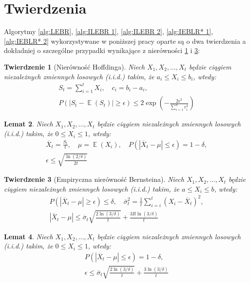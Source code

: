 \documentclass[inzynierska]{pwr_wmat_praca_dyplomowa}
\theoremstyle{plain}
\newtheorem{theorem}{Twierdzenie}
\numberwithin{theorem}{chapter}
\newtheorem{lemma}[theorem]{Lemat}
\theoremstyle{definition}
\numberwithin{theorem}{chapter}
\DeclareMathOperator{\EX}{\mathbb{E}}%
\begin{document}
	\section{Twierdzenia}
	Algorytmy \ref{alg:LEBR}, \ref{alg:ILEBR 1}, \ref{alg:ILEBR 2}, \ref{alg:IEBLR* 1}, \ref{alg:IEBLR* 2} wykorzystywane w poniższej pracy oparte są o dwa twierdzenia a dokładniej o szczególne przypadki wynikające z nierówności \ref{Hoffding ineq} i \ref{Bernsteina emp ineq}:
	\begin{theorem}[Nierówność Hoffdinga]
		\label{Hoffding ineq}
		Niech $X_1,X_2,\dots,X_t$ będzie ciągiem niezależnych zmiennych losowych (i.i.d.) takim, że $a_i \le X_i \le b_i$, wtedy:
		\begin{gather*}
			S_t = \sum_{i=1}^{t} X_i,\quad c_i = b_i - a_i, \\
			P(|S_t - \EX(S_t)| \ge \epsilon ) \le 2\exp\left( -\frac{2\epsilon^2}{\sum_{i=1}^{n} c_i^2} \right)
		\end{gather*}
	\end{theorem}
	\begin{lemma}
		\label{Hoffding ineq lemma}
		Niech $X_1,X_2,\dots,X_t$ będzie ciągiem niezależnych zmiennych losowych (i.i.d.) takim, że $0 \le X_i \le 1$, wtedy:
		\begin{gather*}
			\overline{X}_t = \frac{S_t}{t},\quad 
			\mu = \EX(X_i),\quad  	
			P(|\overline{X}_t - \mu | \le \epsilon ) = 1 - \delta, \\
			\epsilon \le  \sqrt{\frac{\ln(2/\delta)}{2t}}   
		\end{gather*}
	\end{lemma}

		\begin{theorem}[Empiryczna nierówność Bernsteina]
		\label{Bernsteina emp ineq}
		Niech $X_1,X_2,\dots,X_t$ będzie ciągiem niezależnych zmiennych losowych (i.i.d.) takim, że $a \le X_i \le b$, wtedy:
		\begin{gather*}
			P(|\overline{X}_t - \mu| \ge \epsilon ) \le  \delta, \quad \overline \sigma_t^2 = \frac{1}{t}\sum_{i=i}^{t}(X_i - \overline{X}_t)^2, \\
			|\overline{X}_t - \mu | \le \overline{\sigma}_t \sqrt{\frac{2\ln(3/\delta)}{t}} + \frac{3 R \ln{(3 / \delta)}}{t}
		\end{gather*}
	\end{theorem}
	\begin{lemma}\label{Bernsteina emp ineq lemma}
		Niech $X_1,X_2,\dots,X_t$ będzie ciągiem niezależnych zmiennych losowych (i.i.d.) takim, że $0 \le X_i \le 1$, wtedy:
		\begin{gather*}
			P(|\overline{X}_t - \mu | \le \epsilon ) = 1 - \delta,\\
			\epsilon \le \overline{\sigma}_t \sqrt{\frac{2\ln(3/\delta)}{t}} + \frac{3  \ln{(3 / \delta)}}{t}
		\end{gather*}
	\end{lemma}
\end{document}
